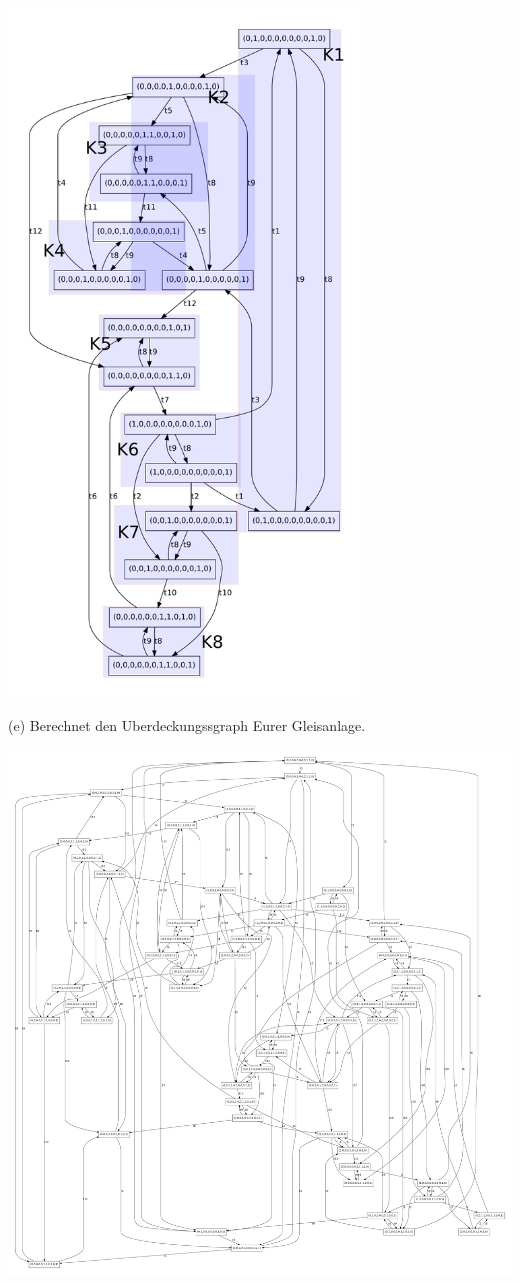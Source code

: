 \documentclass{scrreprt}
\begin{document}
\begin{enumerate}
\includegraphics[width=0.7\textwidth]{kg_easy.pdf}

(e) Berechnet den Uberdeckungssgraph Eurer Gleisanlage.

\includegraphics[width=1\textwidth]{eg.pdf}


\end{enumerate}
\end{document}
